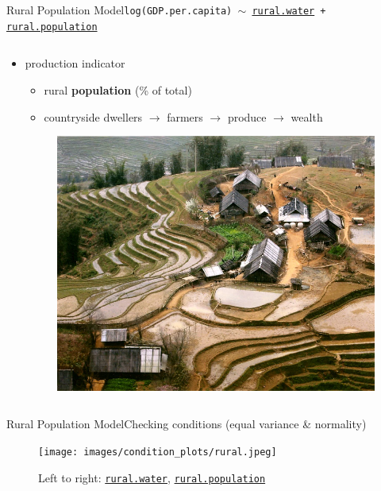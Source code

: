 \documentclass{beamer}
\begin{document}
\begin{frame}{{\sc Rural Population} Model}{\tt log(GDP.per.capita) $\sim$ \href{http://data.worldbank.org/indicator/SH.H2O.SAFE.RU.ZS}{rural.water} + \href{http://data.worldbank.org/indicator/SP.RUR.TOTL.ZS}{rural.population}}
\begin{columns}
    \begin{column}{0.5\textwidth}
      \begin{itemize}
      \item production indicator
        \begin{itemize}
        \item rural {\bf population} (\% of total)
        \item countryside dwellers $\rightarrow$ farmers $\rightarrow$ produce $\rightarrow$ wealth 
        \end{itemize}
        \begin{figure}
	  \centering
	  \includegraphics[scale=0.15]{images/sapa_vietnam_2003.jpg}
	\end{figure}
      \end{itemize}
    \end{column}
  \end{columns}
\end{frame}


\begin{frame}{{\sc Rural Population} Model}{Checking conditions (equal variance \& normality)}
    \begin{figure}
      \centering
      \texttt{[image: images/condition\_plots/rural.jpeg]}
      \caption{Left to right: \href{http://data.worldbank.org/indicator/SH.H2O.SAFE.RU.ZS}{\tt rural.water}, \href{http://data.worldbank.org/indicator/SP.RUR.TOTL.ZS}{\tt rural.population}}
    \end{figure}
\end{frame}
\end{document}
